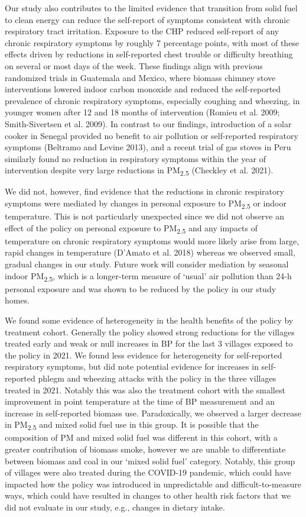 \documentclass[
  letterpaper,
  DIV=11,
  numbers=noendperiod]{scrartcl}
\begin{document}
Our study also contributes to the limited evidence that transition from
solid fuel to clean energy can reduce the self-report of symptoms
consistent with chronic respiratory tract irritation. Exposure to the
CHP reduced self-report of any chronic respiratory symptoms by roughly 7
percentage points, with most of these effects driven by reductions in
self-reported chest trouble or difficulty breathing on several or most
days of the week. These findings align with previous randomized trials
in Guatemala and Mexico, where biomass chimney stove interventions
lowered indoor carbon monoxide and reduced the self-reported prevalence
of chronic respiratory symptoms, especially coughing and wheezing, in
younger women after 12 and 18 months of intervention (Romieu et al.
2009; Smith-Sivertsen et al. 2009). In contrast to our findings,
introduction of a solar cooker in Senegal provided no benefit to air
pollution or self-reported respiratory symptoms (Beltramo and Levine
2013), and a recent trial of gas stoves in Peru similarly found no
reduction in respiratory symptoms within the year of intervention
despite very large reductions in PM\textsubscript{2.5} (Checkley et al.
2021).

We did not, however, find evidence that the reductions in chronic
respiratory symptoms were mediated by changes in personal exposure to
PM\textsubscript{2.5} or indoor temperature. This is not particularly
unexpected since we did not observe an effect of the policy on personal
exposure to PM\textsubscript{2.5} and any impacts of temperature on
chronic respiratory symptoms would more likely arise from large, rapid
changes in temperature (D'Amato et al. 2018) whereas we observed small,
gradual changes in our study. Future work will consider mediation by
seasonal indoor PM\textsubscript{2.5}, which is a longer-term measure of
`usual' air pollution than 24-h personal exposure and was shown to be
reduced by the policy in our study homes.

We found some evidence  of heterogeneity in the health
benefits of the policy by treatment cohort. Generally the policy showed
strong reductions for the villages treated early and weak or null
increases in BP for the last 3 villages exposed to the policy in 2021.
We found less evidence for heterogeneity for self-reported respiratory
symptoms, but did note potential evidence for increases in self-reported
phlegm and wheezing attacks with the policy in the three villages
treated in 2021. Notably this was also the treatment cohort with the
smallest improvement in point temperature at the time of BP measurement
and an increase in self-reported biomass use. Paradoxically, we observed
a larger decrease in PM\textsubscript{2.5} and mixed solid fuel use in
this group. It is possible that the composition of PM and mixed solid
fuel was different in this cohort, with a greater contribution of
biomass smoke, however we are unable to differentiate between biomass
and coal in our `mixed solid fuel' category. Notably, this group of
villages were also treated during the COVID-19 pandemic, which could
have impacted how the policy was introduced in unpredictable and
difficult-to-measure ways, which could have resulted in changes to other
health risk factors that we did not evaluate in our study, e.g., changes
in dietary intake.
\end{document}
